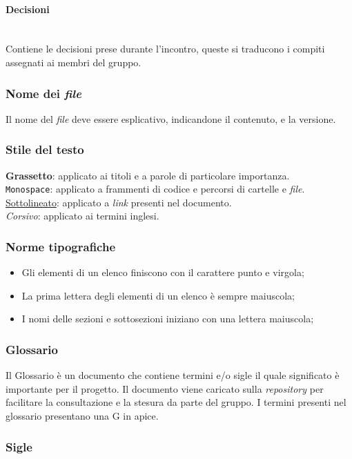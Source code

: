 \documentclass[5pt]{article}
\begin{document}
\paragraph{Decisioni}~\\
Contiene le decisioni prese durante l'incontro, queste si traducono i compiti assegnati ai membri del gruppo.

\subsubsection{Nome dei \textit{file}}
Il nome del \textit{file} deve essere esplicativo, indicandone il contenuto, e la versione.

\subsubsection{Stile del testo}
\textbf{Grassetto}: applicato ai titoli e a parole di particolare importanza. \\
\texttt{Monospace}: applicato a frammenti di codice e percorsi di cartelle e \textit{file}. \\
\underline{Sottolineato}: applicato a \textit{link} presenti nel documento.\\
\textit{Corsivo}: applicato ai termini inglesi.

\subsubsection{Norme tipografiche}
\begin{itemize}
    \item Gli elementi di un elenco finiscono con il carattere punto e virgola;
    \item La prima lettera degli elementi di un elenco è sempre maiuscola;
    \item I nomi delle sezioni e sottosezioni iniziano con una lettera maiuscola;
\end{itemize}

\subsubsection{Glossario}
Il Glossario è un documento che contiene termini e/o sigle il quale significato è importante per il progetto. Il documento viene caricato sulla \textit{repository} per facilitare la consultazione e la stesura da parte del gruppo. I termini presenti nel glossario presentano una G in apice.

\subsubsection{Sigle}
\end{document}
